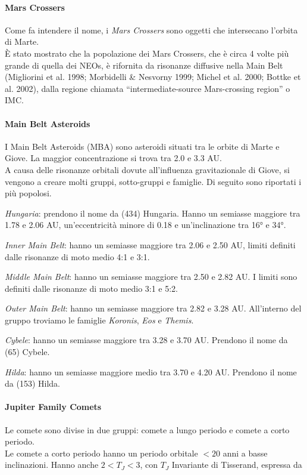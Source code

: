 \documentclass[a4paper,11pt,openright]{book}
\begin{document}
\paragraph*{Mars Crossers}
Come fa intendere il nome, i \textit{Mars Crossers} sono oggetti che intersecano l’orbita di Marte.\\
È stato mostrato che la popolazione dei Mars Crossers, che è circa 4 volte più grande di quella dei NEOs, è rifornita da risonanze diffusive nella Main Belt (Migliorini et al. 1998; Morbidelli \& Nesvorny 1999; Michel et al. 2000; Bottke et al. 2002), dalla regione chiamata “intermediate-source Mars-crossing region” o IMC.

\paragraph*{Main Belt Asteroids}
I Main Belt Asteroids (MBA) sono asteroidi situati tra le orbite di Marte e Giove. La maggior concentrazione si trova tra 2.0 e 3.3 AU.\\
A causa delle risonanze orbitali dovute all’influenza gravitazionale di Giove, si vengono a creare molti gruppi, sotto-gruppi e famiglie. Di seguito sono riportati i più popolosi.

\qquad \textit{Hungaria}: prendono il nome da (434) Hungaria. Hanno un semiasse maggiore tra 1.78 e 2.06 AU, un’eccentricità minore di 0.18 e un’inclinazione tra 16° e 34°. 

\qquad \textit{Inner Main Belt}: hanno un semiasse maggiore tra 2.06 e 2.50 AU, limiti definiti dalle risonanze di moto medio 4:1 e 3:1.

\qquad \textit{Middle Main Belt}: hanno un semiasse maggiore tra 2.50 e 2.82 AU. I limiti sono definiti dalle risonanze di moto medio 3:1 e 5:2.

\qquad \textit{Outer Main Belt}: hanno un semiasse maggiore tra 2.82 e 3.28 AU. All’interno del gruppo troviamo le famiglie \textit{Koronis}, \textit{Eos} e \textit{Themis}.

\qquad \textit{Cybele}: hanno un semiasse maggiore tra 3.28 e 3.70 AU. Prendono il nome da (65) Cybele.

\qquad \textit{Hilda}: hanno un semiasse maggiore medio tra 3.70 e 4.20 AU. Prendono il nome da (153) Hilda.

\paragraph*{Jupiter Family Comets}
Le comete sono divise in due gruppi: comete a lungo periodo e comete a corto periodo.\\
Le comete a corto periodo hanno un periodo orbitale $< 20$ anni a basse inclinazioni. Hanno anche $2<T_J<3$, con $T_J$ Invariante di Tisserand, espressa da
\end{document}

